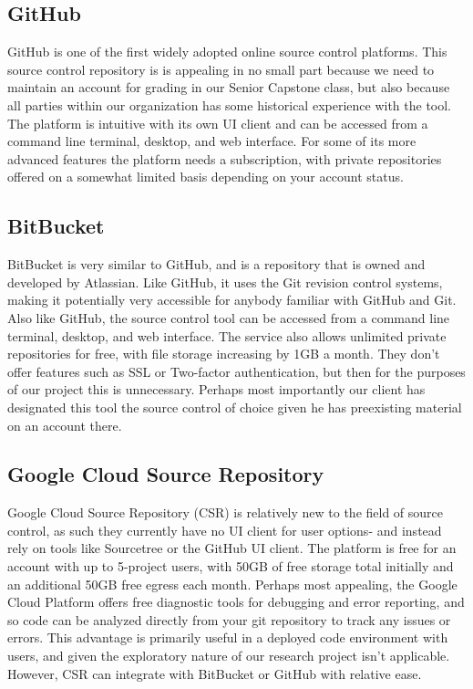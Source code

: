 \documentclass[onecolumn, draftclsnofoot,10pt, compsoc]{IEEEtran}
\begin{document}
\subsection{GitHub}
GitHub is one of the first widely adopted online source control platforms. This source control repository is is appealing in no small part because we need to maintain an account for grading in our Senior Capstone class, but also because all parties within our organization has some historical experience with the tool. The platform is intuitive with its own UI client and can be accessed from a command line terminal, desktop, and web interface\cite{sc}. For some of its more advanced features the platform needs a subscription, with private repositories offered on a somewhat limited basis depending on your account status.
\subsection{BitBucket}
BitBucket is very similar to GitHub, and is a repository that is owned and developed by Atlassian. Like GitHub, it uses the Git revision control systems, making it potentially very accessible for anybody familiar with GitHub and Git. Also like GitHub, the source control tool can be accessed from a command line terminal, desktop, and web interface\cite{sc}. The service also allows unlimited private repositories for free, with file storage increasing by 1GB a month. They don't offer features such as SSL or Two-factor authentication, but then for the purposes of our project this is unnecessary. Perhaps most importantly our client has designated this tool the source control of choice given he has preexisting material on an account there.
\subsection{Google Cloud Source Repository}
Google Cloud Source Repository (CSR) is relatively new to the field of source control, as such they currently have no UI client for user options- and instead rely on tools like Sourcetree or the GitHub UI client. The platform is free for an account with up to 5-project users, with 50GB of free storage total initially and an additional 50GB free egress each month\cite{sc}. Perhaps most appealing, the Google Cloud Platform offers free diagnostic tools for debugging and error reporting, and so code can be analyzed directly from your git repository to track any issues or errors. This advantage is primarily useful in a deployed code environment with users, and given the exploratory nature of our research project isn't applicable. However, CSR can integrate with BitBucket or GitHub with relative ease.
\end{document}
